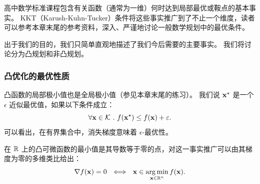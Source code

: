 高中数学标准课程包含有关函数（通常为一维）何时达到局部最优或鞍点的基本事实。
KKT（Karush-Kuhn-Tucker）条件将这些事实推广到了不止一个维度，读者可以参考本章末尾的参考资料，深入、严谨地讨论一般数学规划中的最优条件。

出于我们的目的，我们只简单直观地描述了我们今后需要的主要事实。
我们将讨论分为凸规划和非凸规划。 

\subsubsection{
    凸优化的最优性质
    } 

凸函数的局部极小值也是全局极小值（参见本章末尾的练习）。
我们说 $\mathbf x^\star$ 是一个 $\epsilon$ 近似最优值，如果以下条件成立：
$$ \forall \mathbf x \in \mathcal K \ . \  f(\mathbf x^\star) \leq f(\mathbf x) + \varepsilon .$$ 
可以看出，在有界集合中，消失梯度意味着 $\epsilon$-最优性。

在 ${\mathbb R}$ 上的凸可微函数的最小值是其导数等于零的点，对这一事实推广可以由其梯度为零的多维类比给出：
$$ \nabla f(\x ) =  0  \ \ \Longleftrightarrow  \ \ \x \in \argmin_{\x \in \reals^n} f(\x).$$ 


